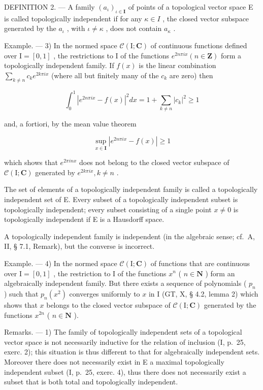 DEFINITION 2. --- A family \((a_{\iota})_{\iota\in\mathbf{I}}\) of points of a topological vector space E is called topologically independent if for any \(\kappa\in I\) , the closed vector subspace generated by the \(a_{\iota}\) , with \(\iota\neq\kappa\) , does not contain \(a_{\kappa}\) .

Example. --- 3) In the normed space \(\mathcal{C}(\mathrm{I};\mathbf{C})\) of continuous functions defined over \(\mathrm{I} = [0,1]\) , the restrictions to \(\mathrm{I}\) of the functions \(e^{2n\pi ix}(n\in \mathbf{Z})\) form a topologically independent family. If \(f(x)\) is the linear combination \(\sum_{k\neq n}c_k e^{2k\pi ix}\) (where all but finitely many of the \(c_k\) are zero) then

\[
\int_ {0} ^ {1} \left| e ^ {2 n \pi i x} - f (x) \right| ^ {2} d x = 1 + \sum_ {k \neq n} | c _ {k} | ^ {2} \geqslant 1
\]

and, a fortiori, by the mean value theorem

\[
\sup _ {x \in \mathbf {I}} \left| e ^ {2 n \pi i x} - f (x) \right| \geqslant 1
\]

which shows that \(e^{2\pi inx}\) does not belong to the closed vector subspace of \(\mathcal{C}(\mathrm{I};\mathbf{C})\) generated by \(e^{2k\pi ix}, k \neq n\) .

The set of elements of a topologically independent family is called a topologically independent set of E. Every subset of a topologically independent subset is topologically independent; every subset consisting of a single point \(x \neq 0\) is topologically independent if E is a Hausdorff space.

A topologically independent family is independent (in the algebraic sense; cf.~A, II, § 7.1, Remark), but the converse is incorrect.

Example. --- 4) In the normed space \(\mathcal{C}(\mathrm{I};\mathbf{C})\) of functions that are continuous over \(\mathrm{I} = [0,1]\) , the restriction to \(\mathrm{I}\) of the functions \(x^n\) ( \(n\in \mathbf{N}\) ) form an algebraically independent family. But there exists a sequence of polynomials ( \(p_n\) ) such that \(p_n(x^2)\) converges uniformly to \(x\) in \(\mathrm{I}\) (GT, X, § 4.2, lemma 2) which shows that \(x\) belongs to the closed vector subspace of \(\mathcal{C}(\mathrm{I};\mathbf{C})\) generated by the functions \(x^{2n}\) ( \(n\in \mathbf{N}\) ).

Remarks. --- 1) The family of topologically independent sets of a topological vector space is not necessarily inductive for the relation of inclusion (I, p.~25, exerc. 2); this situation is thus different to that for algebraically independent sets. Moreover there does not necessarily exist in E a maximal topologically independent subset (I, p.~25, exerc. 4), thus there does not necessarily exist a subset that is both total and topologically independent.

